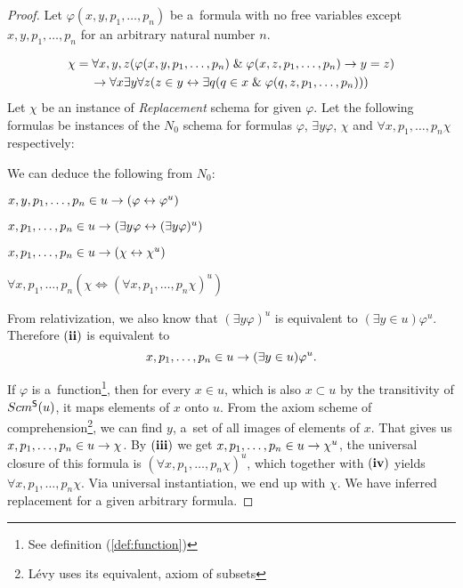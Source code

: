 \begin{proof}
Let $\varphi(x, y, p_1, \ldots, p_n)$ be a~formula with no free variables except $x, y, p_1, \ldots, p_n$ for an arbitrary natural number $n$.

\begin{equation}
\begin{gathered}
\chi = \forall x, y, z(\varphi(x, y, p_1, \ldots, p_n) \mathrel{\&} \varphi(x, z, p_1, \ldots, p_n) \rightarrow y = z) \\
\rightarrow \forall x \exists y \forall z (z \in y \leftrightarrow \exists q (q \in x \mathrel{\&} \varphi(q, z, p_1, \ldots, p_n)))
\end{gathered}
\end{equation}
Let $\chi$ be an instance of \emph{Replacement} schema for given $\varphi$. Let the following formulas be instances of the $N_0$ schema for formulas  $\varphi$, $\exists y \varphi$, $\chi$ and $\forall x, p_1, \ldots, p_n \chi$ respectively:

We can deduce the following from $N_0$: 
\bce[(i)]
\item $x, y, p_1, \ldots, p_n \in u \rightarrow (\varphi \leftrightarrow \varphi^{u}) $
\item $x, p_1, \ldots, p_n \in u \rightarrow (\exists y \varphi \leftrightarrow (\exists y \varphi)^{u})$
\item $x, p_1, \ldots, p_n \in u \rightarrow (\chi \leftrightarrow \chi^{u})$
\item $\forall x, p_1, \ldots, p_n (\chi \iff (\forall x, p_1, \ldots, p_n \chi)^{u})$
\ece

From relativization, we also know that $(\exists y \varphi)^{u}$ is equivalent to $(\exists y \in u) \varphi^{u}$.
Therefore $\bold{(ii)}$ is equivalent to
\begin{equation}
x, p_1, \ldots, p_n \in u \rightarrow (\exists y \in u) \varphi^{u}. 
\end{equation}

If $\varphi$ is a~function\footnote{See definition (\ref{def:function})}, then for every $x \in u$, which is also $x \subset u$ by the transitivity of $Scm^{\sf{S}}(u)$,
it maps elements of $x$ onto $u$. From the axiom scheme of comprehension\footnote{Lévy uses its equivalent, axiom of subsets}, we can find $y$, a~set of all images of elements of $x$.
That gives us $x, p_1, \ldots, p_n \in u \rightarrow \chi$. By $\bold{(iii)}$ we get $x, p_1, \ldots, p_n \in u \rightarrow \chi^{u}$, the universal closure of this formula is $(\forall x, p_1, \ldots, p_n \chi)^{u}$, 
which together with $\bold{(iv)}$ yields $\forall x, p_1, \ldots, p_n \chi$. Via universal instantiation, we end up with $\chi$. We have inferred replacement for a given arbitrary formula. 
\end{proof}

